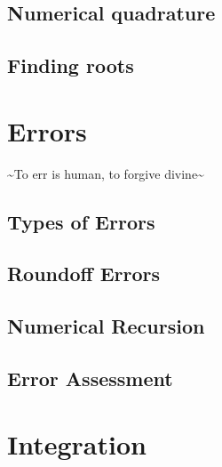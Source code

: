\documentclass[letterpaper,10pt,english]{sphinxmanual}
\begin{document}
\sphinxAtStartPar
{}


\section{Numerical quadrature}
\label{\detokenize{basicmath/basicmath:numerical-quadrature}}

\section{Finding roots}
\label{\detokenize{basicmath/basicmath:finding-roots}}
\sphinxstepscope


\chapter{Errors}
\label{\detokenize{Errors/Errors:errors}}\label{\detokenize{Errors/Errors::doc}}
\sphinxAtStartPar
\textasciitilde{}To err is human, to forgive divine\textasciitilde{}


\section{Types of Errors}
\label{\detokenize{Errors/Errors:types-of-errors}}

\section{Round\sphinxhyphen{}oﬀ Errors}
\label{\detokenize{Errors/Errors:round-off-errors}}

\section{Numerical Recursion}
\label{\detokenize{Errors/Errors:numerical-recursion}}

\section{Error Assessment}
\label{\detokenize{Errors/Errors:error-assessment}}
\sphinxstepscope


\chapter{Integration}
\label{\detokenize{Integration/Integration:integration}}\label{\detokenize{Integration/Integration::doc}}
\sphinxstepscope
\end{document}
